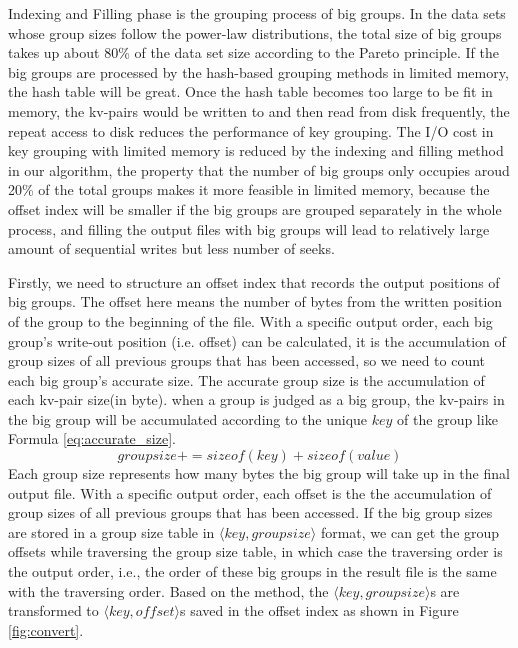 Indexing and Filling phase is the grouping process of big groups. In the data sets whose group sizes follow the power-law distributions, the total size of big groups takes up about 80\% of the data set size according to the Pareto principle. If the big groups are processed by the hash-based grouping methods in limited memory, the hash table will be great. Once the hash table becomes too large to be fit in memory, the kv-pairs would be written to and then read from disk frequently, the repeat access to disk reduces the performance of key grouping. The I/O cost in key grouping with limited memory is reduced by the indexing and filling method in our algorithm, the property that the number of big groups only occupies aroud 20\% of the total groups makes it more feasible in limited memory, because the offset index will be smaller if the big groups are grouped separately in the whole process, and filling the output files with big groups will lead to relatively large amount of sequential writes but less number of seeks. 

Firstly, we need to structure an offset index that records the output positions of big groups. The offset here means the number of bytes from the written position of the group to the beginning of the file. With a specific output order, each big group's write-out position (i.e. offset) can be calculated, it is the accumulation of group sizes of all previous groups that has been accessed, so we need to count each big group's accurate size. The accurate group size is the accumulation of each kv-pair size(in byte). when a group is judged as a big group, the kv-pairs in the big group will be accumulated according to the unique $key$ of the group like Formula \ref{eq:accurate_size}.
\begin{equation}\label{eq:accurate_size}
    groupsize += sizeof(key) + sizeof(value)
\end{equation}
Each group size represents how many bytes the big group will take up in the final output file. With a specific output order, each offset is the
the accumulation of group sizes of all previous groups that has been accessed. If the big group sizes are stored in a group size table in $\langle key, groupsize\rangle$ format, we can get the group offsets while traversing the group size table, in which case the traversing order is the output order, i.e., the order of these big groups in the result file is the same with the traversing order. Based on the method, the $\langle key, groupsize\rangle$s are transformed to $\langle key, offset\rangle$s saved in the offset index as shown in Figure \ref{fig:convert}.

